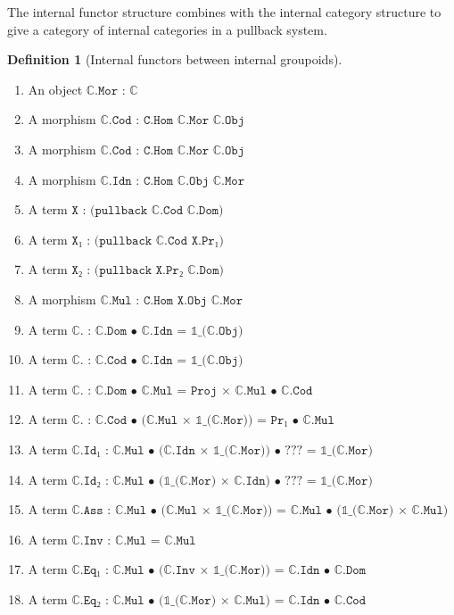 \documentclass{book}
\theoremstyle{definition}
\newtheorem{definition}{Definition}
\begin{document}
The internal functor structure combines with the internal category structure to give a category of internal categories in a pullback system.\\

\begin{definition}[Internal functors between internal groupoids] 
\begin{enumerate}
\item An object $\texttt{ℂ.Mor : ℂ}$ 
\item A morphism $\texttt{ℂ.Cod : C.Hom ℂ.Mor ℂ.Obj}$
\item A morphism $\texttt{ℂ.Cod : C.Hom ℂ.Mor ℂ.Obj}$
\item A morphism $\texttt{ℂ.Idn : C.Hom ℂ.Obj ℂ.Mor}$
\item A term $\texttt{X : (pullback ℂ.Cod ℂ.Dom)}$
\item A term $\texttt{X₁ : (pullback ℂ.Cod X.Pr₁)}$
\item A term $\texttt{X₂ : (pullback X.Pr₂ ℂ.Dom)}$
\item A morphism $\texttt{ℂ.Mul : C.Hom X.Obj ℂ.Mor}$
\item A term $\texttt{ℂ. : ℂ.Dom • ℂ.Idn = 𝟙\_(ℂ.Obj)}$
\item A term $\texttt{ℂ. : ℂ.Cod • ℂ.Idn = 𝟙\_(ℂ.Obj)}$
\item A term $\texttt{ℂ. : ℂ.Dom • ℂ.Mul =  Proj × ℂ.Mul • ℂ.Cod}$
\item A term $\texttt{ℂ. : ℂ.Cod • (ℂ.Mul × 𝟙\_(ℂ.Mor)) = Pr₁ • ℂ.Mul}$
\item A term $\texttt{ℂ.Id₁ : ℂ.Mul • (ℂ.Idn × 𝟙\_(ℂ.Mor)) • ??? = 𝟙\_(ℂ.Mor)}$
\item A term $\texttt{ℂ.Id₂ : ℂ.Mul • (𝟙\_(ℂ.Mor) × ℂ.Idn) • ??? = 𝟙\_(ℂ.Mor)}$
\item A term $\texttt{ℂ.Ass : ℂ.Mul • (ℂ.Mul × 𝟙\_(ℂ.Mor)) = ℂ.Mul • (𝟙\_(ℂ.Mor) × ℂ.Mul)}$
\item A term $\texttt{ℂ.Inv : ℂ.Mul = ℂ.Mul}$
\item A term $\texttt{ℂ.Eq₁ : ℂ.Mul • (ℂ.Inv × 𝟙\_(ℂ.Mor)) = ℂ.Idn • ℂ.Dom}$
\item A term $\texttt{ℂ.Eq₂ : ℂ.Mul • (𝟙\_(ℂ.Mor) × ℂ.Mul) = ℂ.Idn • ℂ.Cod}$
\end{enumerate}
\end{definition}
\end{document}
